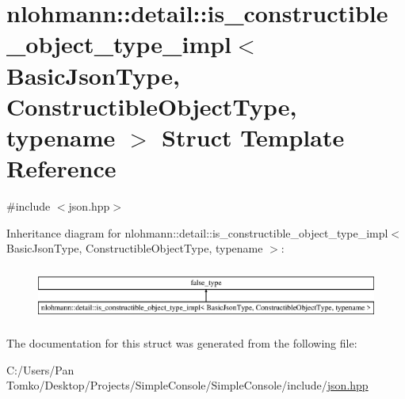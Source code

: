 \hypertarget{structnlohmann_1_1detail_1_1is__constructible__object__type__impl}{}\section{nlohmann\+::detail\+::is\+\_\+constructible\+\_\+object\+\_\+type\+\_\+impl$<$ Basic\+Json\+Type, Constructible\+Object\+Type, typename $>$ Struct Template Reference}
\label{structnlohmann_1_1detail_1_1is__constructible__object__type__impl}


{\ttfamily \#include $<$json.\+hpp$>$}

Inheritance diagram for nlohmann\+::detail\+::is\+\_\+constructible\+\_\+object\+\_\+type\+\_\+impl$<$ Basic\+Json\+Type, Constructible\+Object\+Type, typename $>$\+:\begin{figure}[H]
\begin{center}
\leavevmode
\includegraphics[height=1.789137cm]{dd/da4/structnlohmann_1_1detail_1_1is__constructible__object__type__impl}
\end{center}
\end{figure}


The documentation for this struct was generated from the following file\+:\begin{DoxyCompactItemize}
\item 
C\+:/\+Users/\+Pan Tomko/\+Desktop/\+Projects/\+Simple\+Console/\+Simple\+Console/include/\mbox{\hyperlink{json_8hpp}{json.\+hpp}}\end{DoxyCompactItemize}
